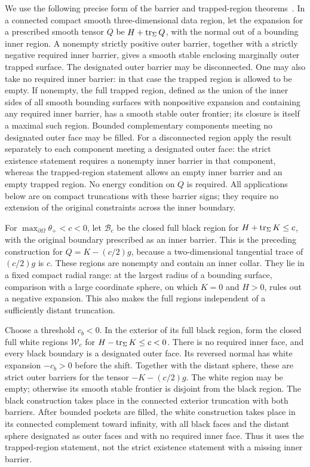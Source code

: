 We use the following precise form of the barrier and trapped-region
theorems~\cite[Theorems 3.1, 4.1 and 7.3]{AnderssonMetzger2009}.
In a connected compact smooth three-dimensional data region, let the expansion
for a prescribed smooth tensor $Q$ be $H+\operatorname{tr}_\Sigma Q$, with the
normal out of a bounding inner region.  A nonempty strictly positive
outer barrier, together with a strictly negative required inner
barrier, gives a smooth stable enclosing marginally outer trapped
surface.  The designated outer barrier may be disconnected.  One
may also take no required inner barrier: in that case the trapped
region is allowed to be empty.  If nonempty, the full trapped region,
defined as the union of the inner sides of all smooth bounding
surfaces with nonpositive expansion and containing any required
inner barrier, has a smooth stable outer frontier; its closure is
itself a maximal such region.  Bounded complementary components
meeting no designated outer face may be filled.  For a disconnected
region apply the result separately to each component meeting a
designated outer face: the strict existence statement requires a
nonempty inner barrier in that component, whereas the trapped-region
statement allows an empty inner barrier and an empty trapped region.
No energy condition
on $Q$ is required.  All applications below are on compact
truncations with these barrier signs; they require no extension of
the original constraints across the inner boundary.

For $\max_{\partial\Omega}\theta_+<c<0$, let $\mathcal B_c$ be the
closed full black region for
$H+\operatorname{tr}_\Sigma K\le c$, with the original boundary prescribed as an
inner barrier.  This is the preceding construction for
$Q=K-(c/2)g$, because a two-dimensional tangential trace of
$(c/2)g$ is $c$.  These regions are nonempty and contain an inner
collar.  They lie in a fixed compact radial range: at the largest
radius of a bounding surface, comparison with a large coordinate
sphere, on which $K=0$ and $H>0$, rules out a negative expansion.
This also makes the full regions independent of a sufficiently
distant truncation.

Choose a threshold $c_b<0$.  In the exterior of its full black region,
form the closed full white regions $\mathcal W_c$ for
$H-\operatorname{tr}_\Sigma K\le c<0$.  There is no required inner face, and every
black boundary is a designated outer face.  Its reversed normal has
white expansion $-c_b>0$ before the shift.  Together with the distant
sphere, these are strict outer barriers for the tensor
$-K-(c/2)g$.  The white region may be empty; otherwise its smooth
stable frontier is disjoint from the black region.
The black construction takes place in the connected exterior
truncation with both barriers.  After bounded pockets are filled,
the white construction takes place in its connected complement
toward infinity, with all black faces and the distant sphere
designated as outer faces and with no required inner face.  Thus it
uses the trapped-region statement, not the strict existence
statement with a missing inner barrier.

